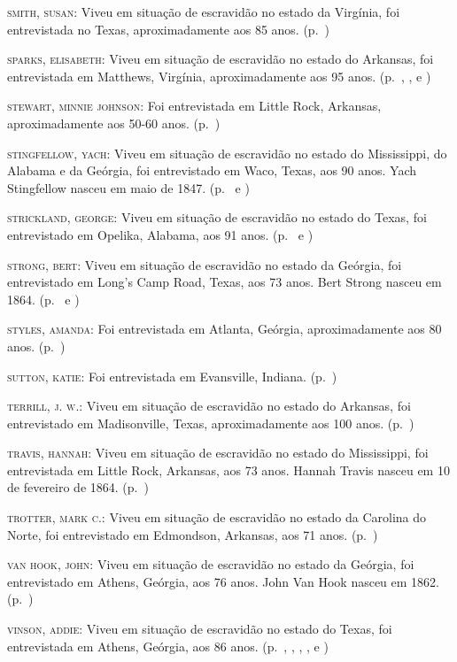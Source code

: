 \begin{Parskip}
\textsc{smith, susan:} Viveu em situação de escravidão no estado da Virgínia, foi entrevistada
no Texas, aproximadamente aos 85 anos. (p.~\pageref{ref248})

\textsc{sparks, elisabeth:} Viveu em situação de escravidão no estado do Arkansas, foi
entrevistada em Matthews, Virgínia, aproximadamente aos 95 anos. (p.~\pageref{ref249}, \pageref{ref250}, \pageref{ref251} e \pageref{ref252})

\textsc{stewart, minnie johnson:} Foi entrevistada em Little Rock,
Arkansas, aproximadamente aos 50-60 anos. (p.~\pageref{ref253})

\textsc{stingfellow, yach:} Viveu em situação de escravidão no estado do Mississippi, do Alabama
e da Geórgia, foi entrevistado em Waco, Texas, aos 90 anos. Yach
Stingfellow nasceu em maio de 1847. (p.~\pageref{ref254} e \pageref{ref255})

\textsc{strickland, george:} Viveu em situação de escravidão no estado do Texas, foi
entrevistado em Opelika, Alabama, aos 91 anos. (p.~\pageref{ref256} e \pageref{ref257})

\textsc{strong, bert:} Viveu em situação de escravidão no estado da Geórgia, foi entrevistado em
Long's Camp Road, Texas, aos 73 anos. Bert Strong nasceu em 1864. (p.~\pageref{ref258} e \pageref{ref259})

\textsc{styles, amanda:} Foi entrevistada em Atlanta, Geórgia,
aproximadamente aos 80 anos. (p.~\pageref{ref260})

\textsc{sutton, katie:} Foi entrevistada em Evansville, Indiana. (p.~\pageref{ref261})

\textsc{terrill, j. w.:} Viveu em situação de escravidão no estado do Arkansas, foi entrevistado
em Madisonville, Texas, aproximadamente aos 100 anos. (p.~\pageref{ref262})

\textsc{travis, hannah:} Viveu em situação de escravidão no estado do Mississippi, foi
entrevistada em Little Rock, Arkansas, aos 73 anos. Hannah Travis nasceu
em 10 de fevereiro de 1864. (p.~\pageref{ref263})

\textsc{trotter, mark c.:} Viveu em situação de escravidão no estado da Carolina do Norte, foi
entrevistado em Edmondson, Arkansas, aos 71 anos. (p.~\pageref{ref264})

\textsc{van hook, john:} Viveu em situação de escravidão no estado da Geórgia, foi entrevistado
em Athens, Geórgia, aos 76 anos. John Van Hook nasceu em 1862. (p.~\pageref{ref265})

\textsc{vinson, addie:} Viveu em situação de escravidão no estado do Texas, foi entrevistada em
Athens, Geórgia, aos 86 anos. (p.~\pageref{ref266}, \pageref{ref267}, \pageref{ref268}, \pageref{ref269}, \pageref{ref270} e \pageref{ref271})


\end{Parskip}

